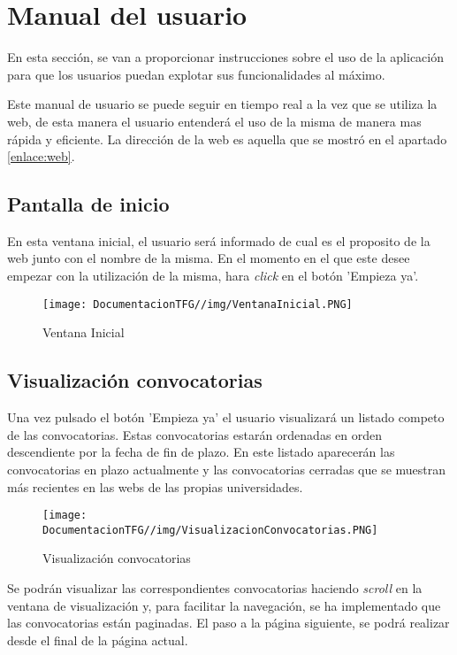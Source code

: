 \section{Manual del usuario}
En esta sección, se van a proporcionar instrucciones sobre el uso de la aplicación para que los usuarios puedan explotar sus funcionalidades al máximo.

Este manual de usuario se puede seguir en tiempo real a la vez que se utiliza la web, de esta manera el usuario entenderá el uso de la misma de manera mas rápida y eficiente. La dirección de la web es aquella que se mostró en el apartado \ref{enlace:web}.

\subsection{Pantalla de inicio}
En esta ventana inicial, el usuario será informado de cual es el proposito de la web junto con el nombre de la misma. En el momento en el que este desee empezar con la utilización de la misma, hara \textit{click} en el botón 'Empieza ya'.
\begin{figure}[H]
    \centering
    \texttt{[image: DocumentacionTFG//img/VentanaInicial.PNG]}
    \caption{Ventana Inicial}
    \label{fig:ventana-inicial}
\end{figure}

\subsection{Visualización convocatorias}
Una vez pulsado el botón 'Empieza ya' el usuario visualizará un listado competo de las convocatorias. Estas convocatorias estarán ordenadas en orden descendiente por la fecha de fin de plazo. En este listado aparecerán las convocatorias en plazo actualmente y las convocatorias cerradas que se muestran más recientes en las webs de las propias universidades.

\begin{figure}[H]
    \centering
    \texttt{[image: DocumentacionTFG//img/VisualizacionConvocatorias.PNG]}
    \caption{Visualización convocatorias}
    \label{fig:visualizacion-convocatorias}
\end{figure}

Se podrán visualizar las correspondientes convocatorias haciendo \textit{scroll} en la ventana de visualización y, para facilitar la navegación, se ha implementado que las convocatorias están paginadas. El paso a la página siguiente, se podrá realizar desde el final de la página actual.

